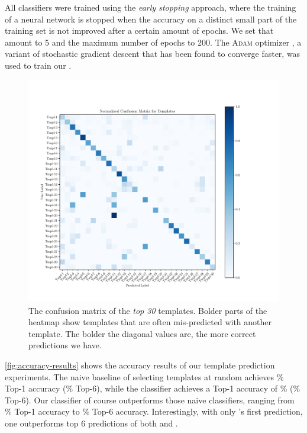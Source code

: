 All classifiers were trained using the \emph{early stopping} approach, where the
training of a neural network is stopped when the accuracy on a distinct small
part of the training set is not improved after a certain amount of epochs. We
set that amount to 5 and the maximum number of epochs to 200. The \textsc{Adam}
optimizer \citep{Kingma2014-ng}, a variant of stochastic gradient descent that
has been found to converge faster, was used to train our \dnn.



\begin{figure}[t]
  \centering
  \includegraphics[trim={30 40 100 70},clip,width=\linewidth]{evaluation-conf-matrix.pdf}
  \caption{The confusion matrix of the \emph{top 30} templates. Bolder parts of
  the heatmap show templates that are often mis-predicted with another template.
  The bolder the diagonal values are, the more correct predictions we have.}
  \label{fig:conf-matrix}
\end{figure}

\autoref{fig:accuracy-results} shows the accuracy results of our template
prediction experiments. The naive baseline of selecting templates at random
achieves \RandomTopOne\% Top-1 accuracy (\RandomTopSix\% Top-6), while the
\popular classifier achieves a Top-1 accuracy of \PopularTopOne\%
(\PopularTopSix\% Top-6). Our \dnn classifier of course outperforms those naive
classifiers, ranging from \DnnTopOne\% Top-1 accuracy to \DnnTopSix\% Top-6
accuracy. Interestingly, with only \dnn's first prediction, one outperforms top
6 predictions of both \random and \popular.


